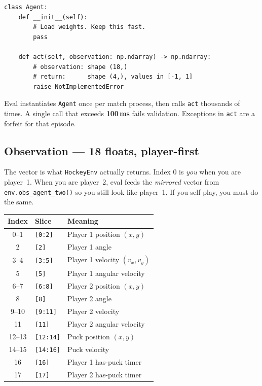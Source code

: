 \documentclass[11pt,a4paper]{article}
\begin{document}
\noindent\begin{minipage}{\textwidth}
\begin{lstlisting}
class Agent:
    def __init__(self):
        # Load weights. Keep this fast.
        pass

    def act(self, observation: np.ndarray) -> np.ndarray:
        # observation: shape (18,)
        # return:      shape (4,), values in [-1, 1]
        raise NotImplementedError
\end{lstlisting}
\end{minipage}

Eval instantiates \texttt{Agent} once per match process, then calls \texttt{act} thousands of times. A single call that exceeds \textbf{100\,ms} fails validation. Exceptions in \texttt{act} are a forfeit for that episode.

\subsection{Observation --- 18 floats, player-first}

The vector is what \texttt{HockeyEnv} actually returns. Index 0 is \emph{you} when you are player~1. When you are player~2, eval feeds the \emph{mirrored} vector from \texttt{env.obs\_agent\_two()} so you still look like player~1. If you self-play, you must do the same.

\begin{center}
\small
\begin{tabular}{@{}cl l@{}}
\toprule
\sffamily\bfseries Index & \sffamily\bfseries Slice & \sffamily\bfseries Meaning \\
\midrule
0--1  & \texttt{[0:2]}   & Player 1 position $(x,y)$ \\
2     & \texttt{[2]}     & Player 1 angle \\
3--4  & \texttt{[3:5]}   & Player 1 velocity $(v_x,v_y)$ \\
5     & \texttt{[5]}     & Player 1 angular velocity \\
6--7  & \texttt{[6:8]}   & Player 2 position $(x,y)$ \\
8     & \texttt{[8]}     & Player 2 angle \\
9--10 & \texttt{[9:11]}  & Player 2 velocity \\
11    & \texttt{[11]}    & Player 2 angular velocity \\
12--13& \texttt{[12:14]} & Puck position $(x,y)$ \\
14--15& \texttt{[14:16]} & Puck velocity \\
16    & \texttt{[16]}    & Player 1 has-puck timer \\
17    & \texttt{[17]}    & Player 2 has-puck timer \\
\bottomrule
\end{tabular}
\end{center}
\end{document}

